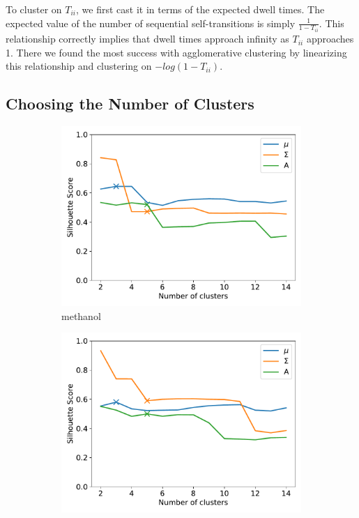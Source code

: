 \documentclass{article}
\begin{document}
  To cluster on $T_{ii}$, we first
  cast it in terms of the expected dwell times. The expected value of the number of sequential
  self-transitions is simply $\frac{1}{1 - T_{ii}}$. This relationship correctly implies that 
  dwell times approach infinity as $T_{ii}$ approaches 1. There we found the most success with
  agglomerative clustering by linearizing this relationship and clustering on $-log(1 - T_{ii})$.
  
  \subsection{Choosing the Number of Clusters}\label{section:nclusters}
  
  \begin{figure}[h]
  \centering
  \begin{subfigure}{0.45\textwidth}
  \includegraphics[width=\textwidth]{silhouette_MET.pdf}
  \caption{methanol}\label{fig:silhouette_MET}
  \end{subfigure}
  \begin{subfigure}{0.45\textwidth}
  \includegraphics[width=\textwidth]{silhouette_URE.pdf}

\end{subfigure}
\end{figure}
\end{document}

